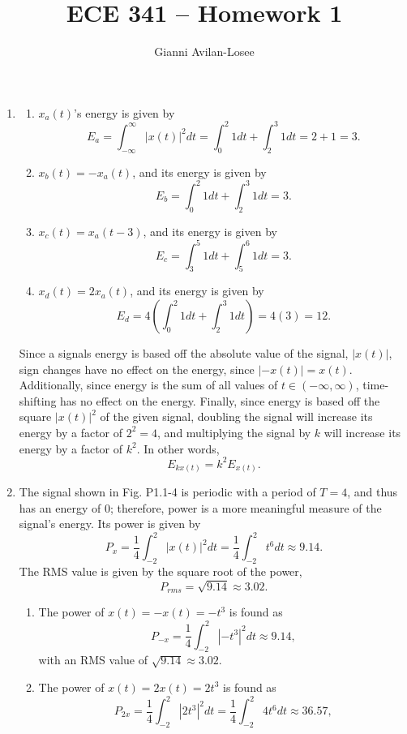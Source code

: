 \documentclass{article}
\title{ECE 341 -- Homework 1}
\author{Gianni Avilan-Losee}
\begin{document}

\begin{enumerate}[label=\thesubsubsection]
\setcounter{section}{1}
\setcounter{subsection}{1}
\setcounter{subsubsection}{1}
		\item
		\begin{enumerate}[label=\alph*)]
			\item \(x_a(t)\)'s energy is given by \[
			 E_a = \int_{-\infty}^{\infty}|x(t)|^2dt = \int_{0}^{2}1dt + \int_{2}^{3}1dt = 2 + 1 = 3.
			\] 
		  \item \(x_b(t) = -x_a(t)\), and its energy is given by \[
		    E_b = \int_{0}^{2}1dt + \int_{2}^{3}1dt = 3.
			\]  
		  \item \(x_c(t) = x_a(t-3)\), and its energy is given by \[
		    E_c = \int_{3}^{5}1dt + \int_{5}^{6}1dt = 3.
		  \]
		  \item \(x_d(t) = 2x_a(t)\), and its energy is given by \[
        E_d = 4(\int_{0}^{2}1dt + \int_{2}^{3}1dt) = 4(3) = 12.	
		  \]
		\end{enumerate}
		Since a signals energy is based off the absolute value of the signal, \(|x(t)|\), sign changes have no effect on the energy, since \(|-x(t)| = x(t)\). Additionally, since energy is the sum of all values of \(t \in (-\infty, \infty)\), time-shifting has no effect on the energy. Finally, since energy is based off the square \(|x(t)|^2\) of the given signal, doubling the signal will increase its energy by a factor of \(2^2 = 4\), and multiplying the signal by \(k\) will increase its energy by a factor of \(k^2\). In other words, \[
		  E_{kx(t)} = k^2E_{x(t)}.
		\] 
		\setcounter{subsubsection}{4}
	\item The signal shown in Fig. P1.1-4 is periodic with a period of \(T=4\), and thus has an energy of 0; therefore, power is a more meaningful measure of the signal's energy. Its power is given by \[
			P_x = \frac{1}{4}\int_{-2}^{2}|x(t)|^{2}dt = \frac{1}{4}\int_{-2}^{2}t^6dt \approx 9.14.
	\] 
	The RMS value is given by the square root of the power, \[
		P_{rms} = \sqrt{9.14} \approx 3.02.
	\]
	\begin{enumerate}[label=\alph*)]
		\item The power of \(x(t) = -x(t) = -t^3\) is found as \[
				P_{-x} = \frac{1}{4}\int_{-2}^{2}|-t^3|^2dt \approx 9.14, 
		\]
		with an RMS value of \(\sqrt{9.14} \approx 3.02.\) 
	  \item The power of \(x(t) = 2x(t) = 2t^3\) is found as \[
				P_{2x} = \frac{1}{4}\int_{-2}^{2}|2t^3|^2dt = \frac{1}{4}\int_{-2}^{2}4t^6dt \approx 36.57, 
\]
\end{enumerate}
\end{enumerate}
\end{document}
